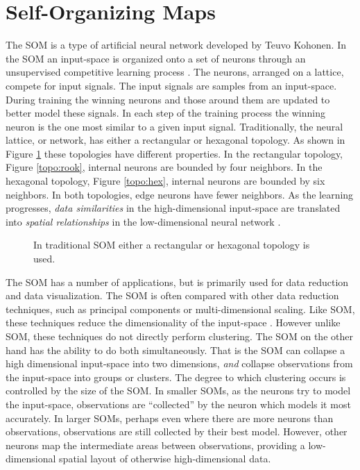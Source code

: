 \section{Self-Organizing Maps}
\label{bg:som}
The SOM is a type of artificial neural network developed by Teuvo Kohonen.  In
the SOM an input-space is organized onto a set of neurons through an
unsupervised competitive learning process \citep{Kohonen2000}. The neurons, arranged on a lattice,
compete for input signals.  The input signals are samples from an input-space.
During training the winning neurons and those around them are updated to
better model these signals. In each step of the training process the winning
neuron is the one most similar to a given input signal.  Traditionally, the
neural lattice, or network, has either a rectangular or hexagonal topology.  As shown in
Figure \ref{topos} these topologies have different properties.  In the
rectangular topology, Figure \ref{topo:rook}, internal neurons are bounded by four
neighbors.  In the hexagonal topology, Figure \ref{topo:hex}, internal neurons are
bounded by six neighbors.  In both topologies, edge neurons have fewer
neighbors.  As the learning progresses, \emph{data similarities} in the
high-dimensional input-space are translated into \emph{spatial relationships}
in the low-dimensional neural network \citep{ritter99}.

\begin{figure}
\centering
{}
\caption{In traditional SOM either a rectangular or hexagonal topology is used.}
\label{topos}
\end{figure}

The SOM has a number of applications, but is primarily used for data reduction
and data visualization.  The SOM is often compared with other data reduction
techniques, such as principal components or multi-dimensional scaling. Like
SOM, these techniques reduce the dimensionality of the input-space
\citep{Kohonen2000,skupin08}. However unlike SOM, these techniques do not
directly perform clustering.  The SOM on the other hand has the ability to do
both simultaneously.  That is the SOM can collapse a high dimensional
input-space into two dimensions, \emph{and} collapse observations from the
input-space into groups or clusters.  The degree to which clustering occurs is
controlled by the size of the SOM.  In smaller SOMs, as the neurons try to
model the input-space, observations are ``collected'' by the neuron which
models it most accurately.  In larger SOMs, perhaps even where there are more
neurons than observations, observations are still collected by their best
model.  However, other neurons map the intermediate areas between
observations, providing a low-dimensional spatial layout of otherwise
high-dimensional data.

